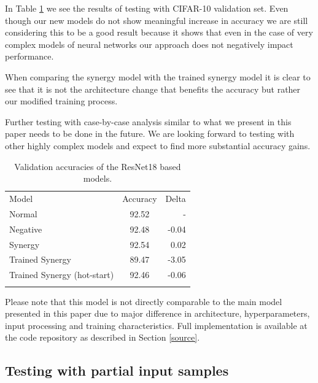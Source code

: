 \documentclass[b5paper]{book}
\begin{document}
In Table \ref{tab:7} we see the results of testing with CIFAR-10 validation set. Even though our new models do not show meaningful increase in accuracy we are still considering this to be a good result because it shows that even in the case of very complex models of neural networks our approach does not negatively impact performance. 

When comparing the synergy model with the trained synergy model it is clear to see that it is not the architecture change that benefits the accuracy but rather our modified training process. 

Further testing with case-by-case analysis similar to what we present in this paper needs to be done in the future. We are looking forward to testing with other highly complex models and expect to find more substantial accuracy gains.

\begin{table}
\centering
\caption{Validation accuracies of the ResNet18 based models.}
\label{tab:7}
\begin{tabular}{lcr}
\hline\noalign{\smallskip}
Model & Accuracy & Delta\\
\noalign{\smallskip}\hline\noalign{\smallskip}
Normal & 92.52 & - \\
Negative & 92.48 & -0.04 \\
Synergy & 92.54 & 0.02 \\
Trained Synergy & 89.47 & -3.05 \\
Trained Synergy (hot-start) & 92.46 & -0.06 \\
\noalign{\smallskip}\hline
\end{tabular}
\end{table}

Please note that this model is not directly comparable to the main model presented in this paper due to major difference in architecture, hyperparameters, input processing and training characteristics. Full implementation is available at the code repository as described in Section \ref{source}.

\subsection{Testing with partial input samples}
\label{partial}
\end{document}
